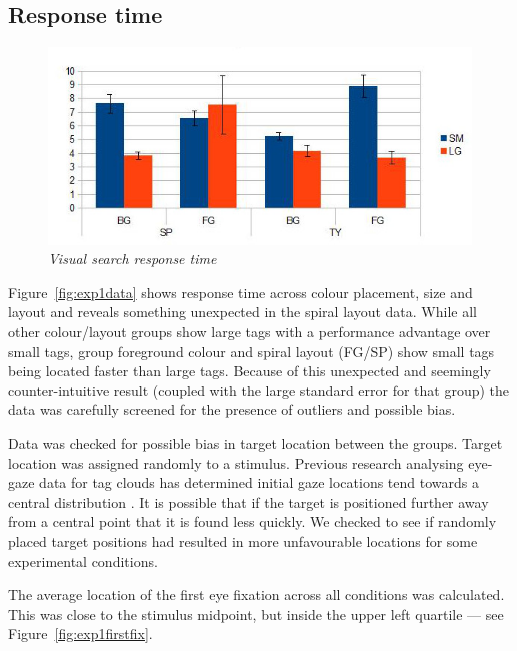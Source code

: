 \subsection{Response time} \label{subsect:responsetime}

\begin{figure}[!htb]
	\centering
	\includegraphics[scale=0.40]{exp1.jpg}
	\caption{\textit{Visual search response time}}
	\label{fig:exp1data}
\end{figure}


Figure~\vref{fig:exp1data} shows response time across colour placement, size and layout and reveals something unexpected in the spiral layout data. While all other colour/layout groups show large tags with a performance advantage over small tags, group foreground colour and spiral layout (FG/SP) show small tags being located faster than large tags. Because of this unexpected and seemingly counter-intuitive result (coupled with the large standard error for that group) the data was carefully screened for the presence of outliers and possible bias.

Data was checked for possible bias in target location between the groups. Target location was assigned randomly to a stimulus. Previous research analysing eye-gaze data for tag clouds has determined initial gaze locations tend towards a central distribution \citep{lohmann09}. It is possible that if the target is positioned further away from a central point that it is found less quickly. We checked to see if randomly placed target positions had resulted in more unfavourable locations for some experimental conditions.

The average location of the first eye fixation across all conditions was calculated. This was close to the stimulus midpoint, but inside the upper left quartile  ---  see Figure~\vref{fig:exp1firstfix}.


